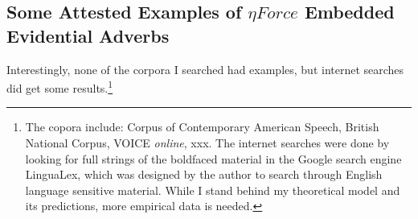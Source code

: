 \documentclass{article}
\begin{document}
\subsection{Some Attested Examples of $\eta Force$ Embedded Evidential Adverbs}\label{subseceta}

Interestingly, none of the corpora I searched had examples, but internet searches did get some results.\footnote{ The copora include: Corpus of Contemporary American Speech, British National Corpus, VOICE {\sl online}, xxx. The internet searches were done by looking for full strings of the boldfaced material in the Google search engine LinguaLex, which was designed by the author to search through English language sensitive material.  While I stand behind my theoretical model and its predictions, more empirical data is needed.} 
\end{document}
